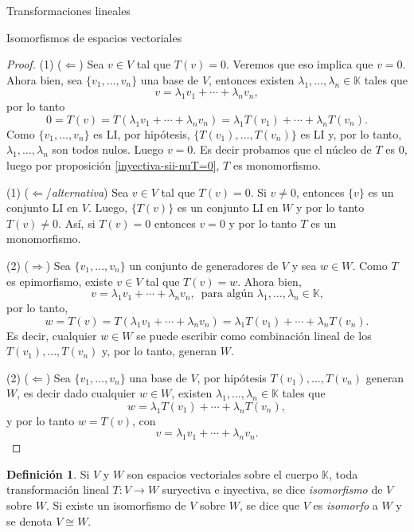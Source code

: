\documentclass[a4paper,12pt,twoside,spanish,reqno]{amsbook}
\theoremstyle{definition}
\newtheorem{definicion}{Definici\'on}[section]
\theoremstyle{remark}
\newcommand{\K}{\mathbb K}
\begin{document}
\begin{chapter}{Transformaciones lineales}
\begin{section}{Isomorfismos de espacios vectoriales}
\begin{proof}
            
            (1) ($\Leftarrow$) Sea $v \in V$ tal que $T(v)=0$. Veremos que eso implica que $v =0$.  Ahora bien, sea  $\{v_1,\ldots,v_n \}$ una base de $V$,  entonces existen $\lambda_1,\ldots,\lambda_n \in \K$ tales que
            $$
            v = \lambda_1v_1+\cdots + \lambda_{n}v_n,
            $$
            por lo tanto
            $$
            0 = T(v) = T(\lambda_1v_1+\cdots + \lambda_{n}v_n) = \lambda_1T(v_1) +\cdots+ \lambda_{n}T(v_n).
            $$
            Como $\{v_1,\ldots,v_n \}$ es LI, por hipótesis, $\{T(v_1),\ldots,T(v_n)\}$ es LI y, por lo tanto, $\lambda_1,\ldots,\lambda_n$ son todos nulos. Luego $v=0$. Es decir probamos  que el núcleo de $T$ es 0, luego por proposición \ref{inyectiva-sii-nuT=0}, $T$ es monomorfismo. 

        (1) ($\Leftarrow$/\textit{alternativa}) Sea $v \in V$ tal que $T(v)=0$.	Si $v\neq 0$, entonces $\{v\}$ es un conjunto LI en $V$. Luego, $\{T(v)\}$ es un conjunto LI en $W$ y por lo tanto $T(v)\neq 0$. Así, si $T(v)=0$ entonces $v=0$ y por lo tanto $T$ es un monomorfismo.
              
            (2) ($\Rightarrow$) Sea   $\{v_1,\ldots,v_n \}$ un conjunto de generadores de $V$ y sea  $w \in W$. Como $T$  es epimorfismo, existe $v \in V$ tal que $T(v)=w$. Ahora bien, 
            $$
            v = \lambda_1v_1+\cdots + \lambda_{n}v_n,\, \text{ para algún $\lambda_1,\ldots,\lambda_n \in \K$,}
            $$
            por lo tanto,
            $$
            w =T(v) = T(\lambda_1v_1+\cdots + \lambda_{n}v_n) = \lambda_1T(v_1) +\cdots+ \lambda_{n}T(v_n).
            $$ 
            Es decir,  cualquier $w \in W$ se puede escribir como combinación lineal de los  $T(v_1),\ldots,T(v_n)$ y, por lo tanto,  generan $W$.
            
            (2) ($\Leftarrow$) Sea $\{v_1,\ldots,v_n \}$ una base de $V$, por hipótesis $T(v_1),\ldots,T(v_n)$ generan $W$,  es decir dado cualquier $w \in W$,   existen $\lambda_1,\ldots,\lambda_n \in \K$ tales que
            $$
            w = \lambda_1T(v_1)+\cdots + \lambda_{n}T(v_n),
            $$
            y por lo tanto $w = T(v)$,  con 
            $$
            v = \lambda_1v_1+\cdots + \lambda_{n}v_n.
            $$
        \end{proof}
        
            

        \begin{definicion}
            Si $V$ y $W$ son espacios vectoriales sobre el cuerpo $\K$, toda transformación	lineal $T:V \to W$ suryectiva e inyectiva, se dice \textit{isomorfismo} de $V$ sobre $W$. Si existe un isomorfismo de $V$ sobre $W$, se dice que $V$ es \textit{isomorfo} a $W$ y se denota $V \cong W$.
        \end{definicion}
        

\end{section}
\end{chapter}
\end{document}
